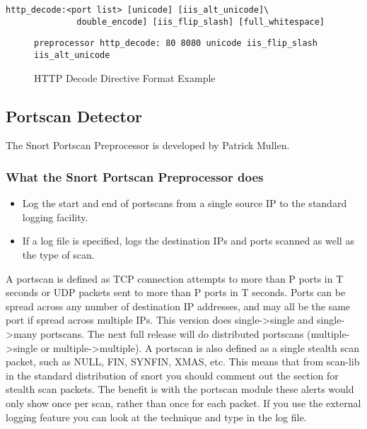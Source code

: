\documentclass[english]{report}
\begin{document}
\begin{verbatim}
http_decode:<port list> [unicode] [iis_alt_unicode]\
              double_encode] [iis_flip_slash] [full_whitespace]
\end{verbatim}
%
\begin{figure}[!hbpt]
\begin{verbatim}
preprocessor http_decode: 80 8080 unicode iis_flip_slash iis_alt_unicode
\end{verbatim}

\caption{\label{http decode directive}HTTP Decode Directive Format Example}
\end{figure}



\subsection{Portscan Detector}

The Snort Portscan Preprocessor is developed by Patrick Mullen.


\subsubsection{What the Snort Portscan Preprocessor does}

\begin{itemize}
\item Log the start and end of portscans from a single source IP to the
standard logging facility.
\item If a log file is specified, logs the destination IPs and ports scanned
as well as the type of scan.
\end{itemize}
A portscan is defined as TCP connection attempts to more than P ports
in T seconds or UDP packets sent to more than P ports in T seconds.
Ports can be spread across any number of destination IP addresses,
and may all be the same port if spread across multiple IPs. This version
does single->single and single->many portscans. The next full release
will do distributed portscans (multiple->single or multiple->multiple).
A portscan is also defined as a single stealth scan
packet, such as NULL, FIN, SYNFIN, XMAS, etc. This means that from
scan-lib in the standard distribution of snort you should comment
out the section for stealth scan packets. The benefit is with the
portscan module these alerts would only show once per scan, rather
than once for each packet. If you use the external logging feature
you can look at the technique and type in the log file.
\end{document}
